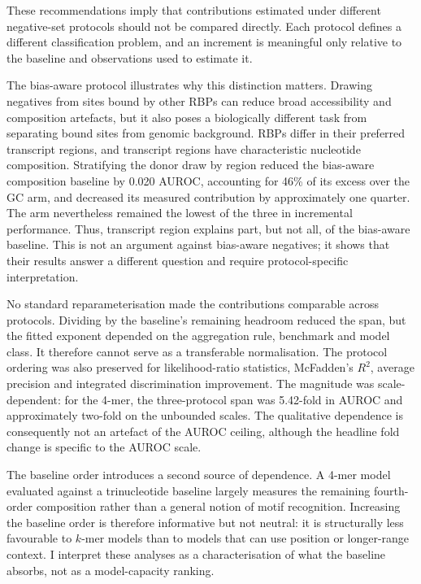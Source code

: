 These recommendations imply that contributions estimated under different negative-set
protocols should not be compared directly. Each protocol defines a different classification
problem, and an increment is meaningful only relative to the baseline and observations used to
estimate it.

The bias-aware protocol illustrates why this distinction matters. Drawing negatives from sites
bound by other RBPs can reduce broad accessibility and composition artefacts, but it also poses
a biologically different task from separating bound sites from genomic background. RBPs differ
in their preferred transcript regions, and transcript regions have characteristic nucleotide
composition. Stratifying the donor draw by region reduced the bias-aware composition baseline
by 0.020 AUROC, accounting for 46\% of its excess over the GC arm, and decreased its measured
contribution by approximately one quarter. The arm nevertheless remained the lowest of the
three in incremental performance. Thus, transcript region explains part, but not all, of the
bias-aware baseline. This is not an argument against bias-aware negatives; it shows that their
results answer a different question and require protocol-specific interpretation.

No standard reparameterisation made the contributions comparable across protocols. Dividing by
the baseline's remaining headroom reduced the span, but the fitted exponent depended on the
aggregation rule, benchmark and model class. It therefore cannot serve as a transferable
normalisation. The protocol ordering was also preserved for likelihood-ratio statistics,
McFadden's $R^2$, average precision and integrated discrimination improvement. The magnitude
was scale-dependent: for the 4-mer, the three-protocol span was 5.42-fold in AUROC and
approximately two-fold on the unbounded scales. The qualitative dependence is consequently not
an artefact of the AUROC ceiling, although the headline fold change is specific to the AUROC
scale.

The baseline order introduces a second source of dependence. A 4-mer model evaluated against a
trinucleotide baseline largely measures the remaining fourth-order composition rather than a
general notion of motif recognition. Increasing the baseline order is therefore informative but
not neutral: it is structurally less favourable to $k$-mer models than to models that can use
position or longer-range context. I interpret these analyses as a characterisation of what the
baseline absorbs, not as a model-capacity ranking.

